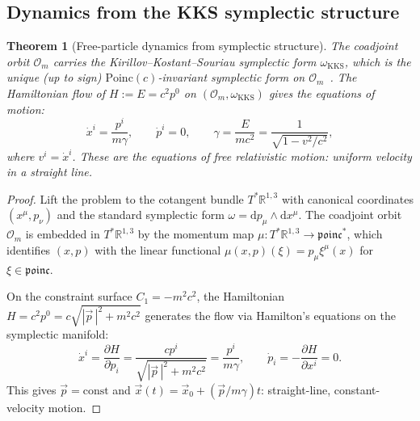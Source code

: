 \documentclass[12pt]{article}
\theoremstyle{plain}
\newtheorem{theorem}{Theorem}[section]
\theoremstyle{definition}
\theoremstyle{remark}
\newcommand{\R}{\mathbb{R}}
\newcommand{\Poinc}{\mathrm{Poinc}}
\newcommand{\dd}{\mathrm{d}}
\begin{document}
\subsection{Dynamics from the KKS symplectic structure}

\begin{theorem}[Free-particle dynamics from symplectic structure]\label{thm:dynamics}
The coadjoint orbit $\mathcal{O}_m$ carries the Kirillov--Kostant--Souriau symplectic form $\omega_{\mathrm{KKS}}$, which is the unique (up to sign) $\Poinc(c)$-invariant symplectic form on $\mathcal{O}_m$~\cite{kirillov1976,kostant1970}. The Hamiltonian flow of $H := E = c^2 p^0$ on $(\mathcal{O}_m, \omega_{\mathrm{KKS}})$ gives the equations of motion:
\begin{equation}\label{eq:eom}
\dot{x}^i = \frac{p^i}{m\gamma}, \qquad \dot{p}^i = 0, \qquad \gamma = \frac{E}{mc^2} = \frac{1}{\sqrt{1 - v^2/c^2}},
\end{equation}
where $v^i = \dot{x}^i$. These are the equations of free relativistic motion: uniform velocity in a straight line.
\end{theorem}

\begin{proof}
Lift the problem to the cotangent bundle $T^*\R^{1,3}$ with canonical coordinates $(x^\mu, p_\nu)$ and the standard symplectic form $\omega = \dd p_\mu \wedge \dd x^\mu$. The coadjoint orbit $\mathcal{O}_m$ is embedded in $T^*\R^{1,3}$ by the momentum map $\mu: T^*\R^{1,3} \to \mathfrak{poinc}^*$, which identifies $(x, p)$ with the linear functional $\mu(x,p)(\xi) = p_\mu \xi^\mu(x)$ for $\xi \in \mathfrak{poinc}$.

On the constraint surface $C_1 = -m^2c^2$, the Hamiltonian $H = c^2 p^0 = c\sqrt{|\vec{p}\,|^2 + m^2c^2}$ generates the flow via Hamilton's equations on the symplectic manifold:
\begin{equation}
\dot{x}^i = \frac{\partial H}{\partial p_i} = \frac{cp^i}{\sqrt{|\vec{p}\,|^2 + m^2c^2}} = \frac{p^i}{m\gamma}, \qquad \dot{p}_i = -\frac{\partial H}{\partial x^i} = 0.
\end{equation}
This gives $\vec{p} = \text{const}$ and $\vec{x}(t) = \vec{x}_0 + (\vec{p}/m\gamma)t$: straight-line, constant-velocity motion.
\end{proof}
\end{document}
